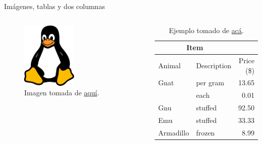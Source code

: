 \documentclass{beamer}
\begin{document}
		\begin{frame}{Imágenes, tablas y dos columnas}
		\begin{columns}
			\begin{figure}
				\caption{Imagen tomada de \href{https://www.picpng.com/linux-unix-tux-penguin-cute-png-43298}{aquí}.}
				\centering
				\includegraphics[width=0.5\textwidth]{tux}
			\end{figure}
			\begin{table}[]
				\begin{tabular}{@{}llr@{}}
					\toprule
					\multicolumn{2}{c}{Item} &            \\ \midrule
					Animal     & Description & Price (\$) \\ \midrule
					Gnat       & per gram    & 13.65      \\
					& each        & 0.01       \\
					Gnu        & stuffed     & 92.50      \\
					Emu        & stuffed     & 33.33      \\
					Armadillo  & frozen      & 8.99       \\ \bottomrule
				\end{tabular}
				\caption{Ejemplo tomado de \href{https://www.tablesgenerator.com/}{acá}.}
				\label{tab:my-table}
			\end{table}
		\end{columns}
	\end{frame}
\end{document}
